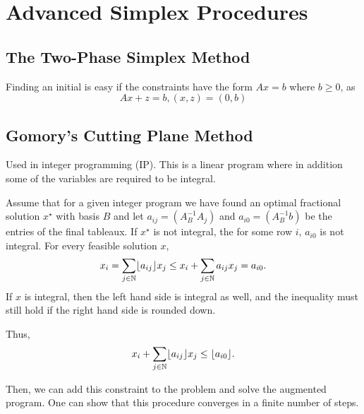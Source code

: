 
\chapter{Advanced Simplex Procedures}
\label{cha:advanc-simpl-proc}

\section{The Two-Phase Simplex Method}
\label{sec:two-phase-simplex}

Finding an initial \bfs is easy if the constraints have the form $Ax =
b$ where $b \geq 0$, as
\begin{equation}
  \label{eq:22}
  Ax + z = b, (x, z) = (0, b)
\end{equation}

\section{Gomory's Cutting Plane Method}
\label{sec:gomorys-cutt-plane}

Used in integer programming (IP).  This is a linear program where in
addition some of the variables are required to be integral.

Assume that for a given integer program we have found an optimal
fractional solution $x^{\star}$ with basis $B$ and let $a_{ij} =
(A_{B}^{-1}A_{j})$ and $a_{i0} = (A_{B}^{-1}b)$ be the entries of the
final tableaux.  If $x^{\star}$ is not integral, the for some row $i$,
$a_{i0}$ is not integral.  For every feasible solution $x$,
\begin{equation}
  \label{eq:25}
  x_{i} = \sum_{j \in \mathbb{N}} \lfloor a_{ij} \rfloor x_{j} \leq x_{i} +
  \sum_{j \in \mathbb{N}} a_{ij} x_{j} = a_{i0}.
\end{equation}  If $x$ is integral, then the left hand side is
integral as well, and the inequality must still hold if the right hand
side is rounded down.

Thus,
\begin{equation}
  \label{eq:26}
  x_{i} + \sum_{j \in \mathbb{N}} \lfloor a_{ij} \rfloor x_{j} \leq \lfloor a_{i0} \rfloor.
\end{equation}

Then, we can add this constraint to the problem and solve the
augmented program. One can show that this procedure converges in a
finite number of steps.


